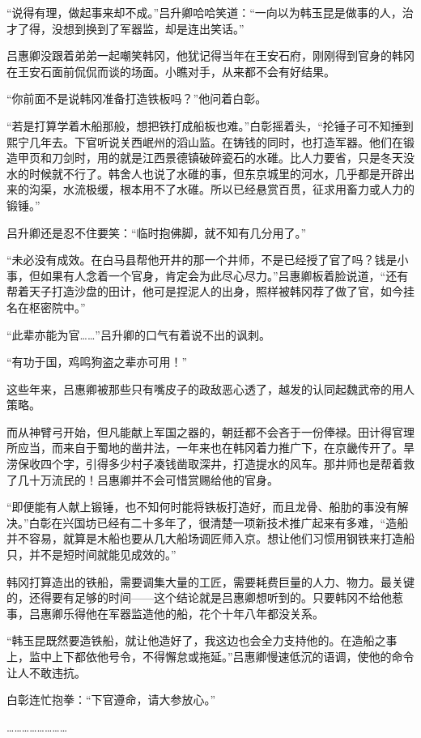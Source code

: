 “说得有理，做起事来却不成。”吕升卿哈哈笑道：“一向以为韩玉昆是做事的人，治才了得，没想到换到了军器监，却是连出笑话。”

吕惠卿没跟着弟弟一起嘲笑韩冈，他犹记得当年在王安石府，刚刚得到官身的韩冈在王安石面前侃侃而谈的场面。小瞧对手，从来都不会有好结果。

“你前面不是说韩冈准备打造铁板吗？”他问着白彰。

“若是打算学着木船那般，想把铁打成船板也难。”白彰摇着头，“抡锤子可不知捶到熙宁几年去。下官听说关西岷州的滔山监。在铸钱的同时，也打造军器。他们在锻造甲页和刀剑时，用的就是江西景德镇破碎瓷石的水碓。比人力要省，只是冬天没水的时候就不行了。韩舍人也说了水碓的事，但东京城里的河水，几乎都是开辟出来的沟渠，水流极缓，根本用不了水碓。所以已经悬赏百贯，征求用畜力或人力的锻锤。”

吕升卿还是忍不住要笑：“临时抱佛脚，就不知有几分用了。”

“未必没有成效。在白马县帮他开井的那一个井师，不是已经授了官了吗？钱是小事，但如果有人念着一个官身，肯定会为此尽心尽力。”吕惠卿板着脸说道，“还有帮着天子打造沙盘的田计，他可是捏泥人的出身，照样被韩冈荐了做了官，如今挂名在枢密院中。”

“此辈亦能为官……”吕升卿的口气有着说不出的讽刺。

“有功于国，鸡鸣狗盗之辈亦可用！”

这些年来，吕惠卿被那些只有嘴皮子的政敌恶心透了，越发的认同起魏武帝的用人策略。

而从神臂弓开始，但凡能献上军国之器的，朝廷都不会吝于一份俸禄。田计得官理所应当，而来自于蜀地的凿井法，一年来也在韩冈着力推广下，在京畿传开了。旱涝保收四个字，引得多少村子凑钱凿取深井，打造提水的风车。那井师也是帮着救了几十万流民的！吕惠卿并不会可惜赏赐给他的官身。

“即便能有人献上锻锤，也不知何时能将铁板打造好，而且龙骨、船肋的事没有解决。”白彰在兴国坊已经有二十多年了，很清楚一项新技术推广起来有多难，“造船并不容易，就算是木船也要从几大船场调匠师入京。想让他们习惯用钢铁来打造船只，并不是短时间就能见成效的。”

韩冈打算造出的铁船，需要调集大量的工匠，需要耗费巨量的人力、物力。最关键的，还得要有足够的时间——这个结论就是吕惠卿想听到的。只要韩冈不给他惹事，吕惠卿乐得他在军器监造他的船，花个十年八年都没关系。

“韩玉昆既然要造铁船，就让他造好了，我这边也会全力支持他的。在造船之事上，监中上下都依他号令，不得懈怠或拖延。”吕惠卿慢速低沉的语调，使他的命令让人不敢违抗。

白彰连忙抱拳：“下官遵命，请大参放心。”

……………………


